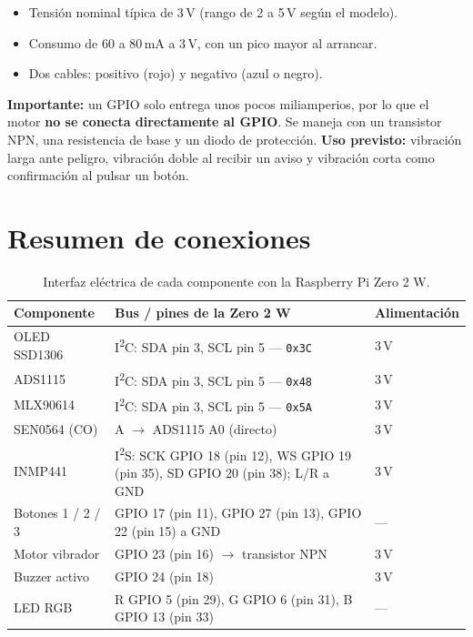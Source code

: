 \documentclass[11pt,a4paper]{article}
\begin{document}
\begin{itemize}[nosep]
  \item Tensión nominal típica de 3\,V (rango de 2 a 5\,V según el modelo).
  \item Consumo de 60 a 80\,mA a 3\,V, con un pico mayor al arrancar.
  \item Dos cables: positivo (rojo) y negativo (azul o negro).
\end{itemize}

\textbf{Importante:} un GPIO solo entrega unos pocos miliamperios, por lo que el
motor \textbf{no se conecta directamente al GPIO}. Se maneja con un transistor
NPN, una resistencia de base y un diodo de protección. \textbf{Uso previsto:}
vibración larga ante peligro, vibración doble al recibir un aviso y vibración
corta como confirmación al pulsar un botón.

\section{Resumen de conexiones}

\begin{table}[H]
\centering
\small
\begin{tabularx}{\textwidth}{@{}>{\raggedright\arraybackslash}p{3.6cm}X>{\raggedright\arraybackslash}p{1.9cm}@{}}
\toprule
\textbf{Componente} & \textbf{Bus / pines de la Zero 2 W} & \textbf{Alimentación} \\
\midrule
OLED SSD1306        & I\textsuperscript{2}C: SDA pin 3, SCL pin 5 --- \texttt{0x3C} & 3{,}3\,V \\
ADS1115             & I\textsuperscript{2}C: SDA pin 3, SCL pin 5 --- \texttt{0x48} & 3{,}3\,V \\
MLX90614            & I\textsuperscript{2}C: SDA pin 3, SCL pin 5 --- \texttt{0x5A} & 3{,}3\,V \\
SEN0564 (CO)        & A $\rightarrow$ ADS1115 A0 (directo)                             & 3{,}3\,V \\
INMP441             & I\textsuperscript{2}S: SCK GPIO 18 (pin 12), WS GPIO 19 (pin 35), SD GPIO 20 (pin 38); L/R a GND & 3{,}3\,V \\
Botones 1 / 2 / 3   & GPIO 17 (pin 11), GPIO 27 (pin 13), GPIO 22 (pin 15) a GND       & --- \\
Motor vibrador      & GPIO 23 (pin 16) $\rightarrow$ transistor NPN                    & 3{,}3\,V \\
Buzzer activo       & GPIO 24 (pin 18)                                                 & 3{,}3\,V \\
LED RGB             & R GPIO 5 (pin 29), G GPIO 6 (pin 31), B GPIO 13 (pin 33)         & --- \\
\bottomrule
\end{tabularx}
\caption{Interfaz eléctrica de cada componente con la Raspberry Pi Zero 2 W.}
\end{table}
\end{document}
